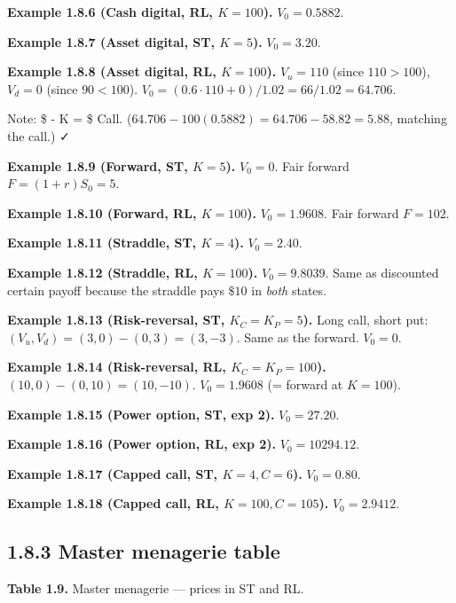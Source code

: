 \documentclass[
  10pt,
  twoside]{book}
\begin{document}
\textbf{Example 1.8.6 (Cash digital, RL, \(K=100\)).} \(V_0=0.5882\).

\textbf{Example 1.8.7 (Asset digital, ST, \(K=5\)).} \(V_0=3.20\).

\textbf{Example 1.8.8 (Asset digital, RL, \(K=100\)).} \(V_u=110\)
(since \(110>100\)), \(V_d=0\) (since \(90<100\)).
\(V_0=(0.6\cdot 110+0)/1.02=66/1.02=64.706\).

Note: \$ - K\cdot{} = \$ Call.
(\(64.706 - 100(0.5882) = 64.706 - 58.82 = 5.88\), matching the call.) ✓

\textbf{Example 1.8.9 (Forward, ST, \(K=5\)).} \(V_0=0\). Fair forward
\(F=(1+r)S_0=5\).

\textbf{Example 1.8.10 (Forward, RL, \(K=100\)).} \(V_0=1.9608\). Fair
forward \(F=102\).

\textbf{Example 1.8.11 (Straddle, ST, \(K=4\)).} \(V_0=2.40\).

\textbf{Example 1.8.12 (Straddle, RL, \(K=100\)).} \(V_0=9.8039\). Same
as discounted certain payoff because the straddle pays \(\$10\) in
\emph{both} states.

\textbf{Example 1.8.13 (Risk-reversal, ST, \(K_C=K_P=5\)).} Long call,
short put: \((V_u,V_d)=(3,0)-(0,3)=(3,-3)\). Same as the forward.
\(V_0=0\).

\textbf{Example 1.8.14 (Risk-reversal, RL, \(K_C=K_P=100\)).}
\((10,0)-(0,10)=(10,-10)\). \(V_0=1.9608\) (= forward at \(K=100\)).

\textbf{Example 1.8.15 (Power option, ST, exp 2).} \(V_0=27.20\).

\textbf{Example 1.8.16 (Power option, RL, exp 2).} \(V_0=10294.12\).

\textbf{Example 1.8.17 (Capped call, ST, \(K=4, C=6\)).} \(V_0=0.80\).

\textbf{Example 1.8.18 (Capped call, RL, \(K=100, C=105\)).}
\(V_0=2.9412\).

\subsection{1.8.3 Master menagerie table}\label{master-menagerie-table}

\textbf{Table 1.9.} Master menagerie --- prices in ST and RL.
\end{document}
